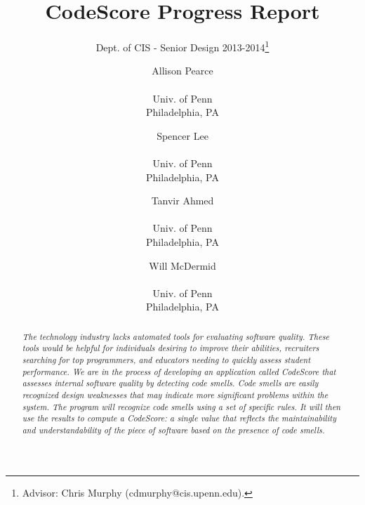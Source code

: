 \documentclass{sig-alternate}
\begin{document}

\title{CodeScore Progress Report}
\subtitle{Dept. of CIS - Senior Design 2013-2014\thanks{Advisor: Chris Murphy (cdmurphy@cis.upenn.edu).}}

\author{
	Allison Pearce \\  \\ Univ. of Penn \\ Philadelphia, PA
	\and Spencer Lee \\  \\ Univ. of Penn \\ Philadelphia, PA
	\and Tanvir Ahmed \\  \\ Univ. of Penn \\ Philadelphia, PA
\and Will McDermid \\  \\ Univ. of Penn \\ Philadelphia, PA}

\date{}
\maketitle

\begin{abstract}
	\textit{The technology industry lacks automated tools for evaluating software
		quality. These tools would be helpful for individuals desiring to improve
		their abilities, recruiters searching for top programmers, and educators
		needing to quickly assess student performance. We are in the process of
		developing an application called CodeScore that assesses internal software
	quality by detecting code smells. Code smells are easily recognized design
weaknesses that may indicate more significant problems within the system. The
program will recognize code smells using a set of specific rules. It will then
use the results to compute a CodeScore: a single value that reflects the
maintainability and understandability of the piece of software based on the
presence of code smells. }
\end{abstract}

\end{document}
